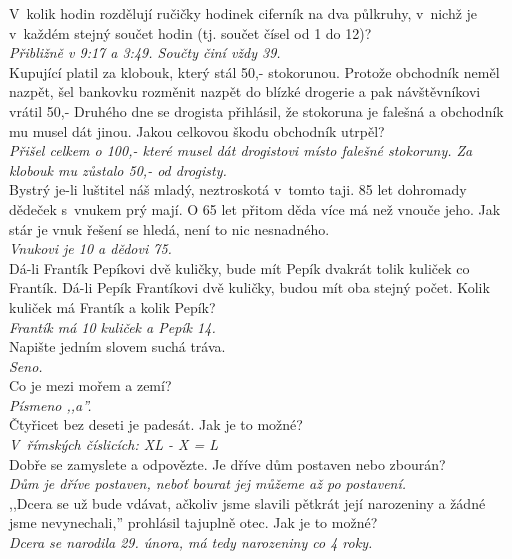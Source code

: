 \begin{multicols}{\value{columnsgames}}
\noindent
V~kolik hodin rozdělují ručičky hodinek ciferník 
na dva půlkruhy, v~nichž je v~každém stejný součet 
hodin (tj. součet čísel od 1 do 12)?\\[1 mm]
{\sl Přibližně v 9:17 a 3:49. Součty činí vždy 39.}\\

\noindent
Kupující platil za klobouk, který stál 50,- stokorunou. 
Protože obchodník neměl nazpět, šel bankovku rozměnit nazpět 
do blízké drogerie a pak návštěvníkovi vrátil 50,- Druhého dne 
se drogista přihlásil, že stokoruna je falešná a obchodník mu 
musel dát jinou. Jakou celkovou škodu obchodník utrpěl?\\[1 mm]
{\sl Přišel celkem o 100,- které musel dát drogistovi místo falešné 
stokoruny. Za klobouk mu zůstalo 50,- od drogisty.}\\

\noindent
Bystrý je-li luštitel náš mladý, neztroskotá v~tomto 
taji. 85 let dohromady dědeček s~vnukem prý mají. O 65 let přitom
děda více má než vnouče jeho. Jak stár je vnuk řešení se hledá,
není to nic nesnadného.\\[1 mm]
{\sl Vnukovi je 10 a dědovi 75.}\\

\noindent
Dá-li Frantík Pepíkovi dvě kuličky, bude mít Pepík dvakrát 
tolik kuliček co Frantík. Dá-li Pepík Frantíkovi dvě kuličky, 
budou mít oba stejný počet. Kolik kuliček má Frantík a kolik 
Pepík?\\[1 mm]
{\sl Frantík má 10 kuliček a Pepík 14.}\\

\noindent
Napište jedním slovem suchá tráva.\\[1 mm]
{\sl Seno.}\\

\noindent
Co je mezi mořem a zemí?\\[1 mm]
{\sl Písmeno ,,a''.}\\

\noindent
Čtyřicet bez deseti je padesát. Jak je to možné?\\[1 mm]
{\sl V~římských číslicích: XL - X = L}\\

\noindent
Dobře se zamyslete a odpovězte. Je dříve dům postaven 
nebo zbourán?\\[1 mm]
{\sl Dům je dříve postaven, neboť bourat jej můžeme až po postavení.}\\

\noindent
,,Dcera se už bude vdávat, ačkoliv jsme slavili pětkrát 
její narozeniny a žádné jsme nevynechali,'' prohlásil tajuplně 
otec. Jak je to možné?\\[1 mm]
{\sl Dcera se narodila 29. února, má tedy narozeniny co 4 roky.}\\


\end{multicols}
